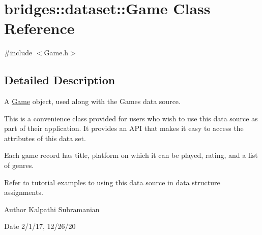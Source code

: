 \hypertarget{classbridges_1_1dataset_1_1_game}{}\section{bridges\+:\+:dataset\+:\+:Game Class Reference}
\label{classbridges_1_1dataset_1_1_game}


{\ttfamily \#include $<$Game.\+h$>$}



\subsection{Detailed Description}
A \hyperlink{classbridges_1_1dataset_1_1_game}{Game} object, used along with the Games data source. 

This is a convenience class provided for users who wish to use this data source as part of their application. It provides an A\+PI that makes it easy to access the attributes of this data set.

Each game record has title, platform on which it can be played, rating, and a list of genres.

Refer to tutorial examples to using this data source in data structure assignments.

\begin{DoxyAuthor}{Author}
Kalpathi Subramanian 
\end{DoxyAuthor}
\begin{DoxyDate}{Date}
2/1/17, 12/26/20 
\end{DoxyDate}
